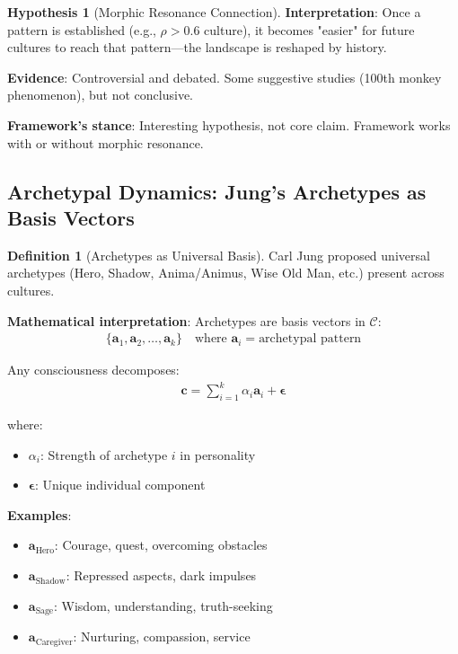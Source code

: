 \documentclass[11pt,a4paper]{article}
\theoremstyle{definition}
\newtheorem{definition}{Definition}[section]
\newtheorem{hypothesis}{Hypothesis}[section]
\theoremstyle{remark}
\newcommand{\CC}{\mathcal{C}}
\newcommand{\cc}{\mathbf{c}}
\begin{document}
\begin{small}
\begin{enumerate}
\begin{hypothesis}[Morphic Resonance Connection]
\textbf{Interpretation}: Once a pattern is established (e.g., \(\rho > 0.6\) culture), it becomes "easier" for future cultures to reach that pattern—the landscape is reshaped by history.

\textbf{Evidence}: Controversial and debated. Some suggestive studies (100th monkey phenomenon), but not conclusive.

\textbf{Framework's stance}: Interesting hypothesis, not core claim. Framework works with or without morphic resonance.
\end{hypothesis}

\subsection{Archetypal Dynamics: Jung's Archetypes as Basis Vectors}

\begin{definition}[Archetypes as Universal Basis]
Carl Jung proposed universal archetypes (Hero, Shadow, Anima/Animus, Wise Old Man, etc.) present across cultures.

\textbf{Mathematical interpretation}: Archetypes are basis vectors in \(\CC\):
\begin{align}
\{\mathbf{a}_1, \mathbf{a}_2, \ldots, \mathbf{a}_k\} \quad \text{where } \mathbf{a}_i = \text{archetypal pattern}
\end{align}

Any consciousness decomposes:
\begin{align}
\cc = \sum_{i=1}^k \alpha_i \mathbf{a}_i + \boldsymbol{\epsilon}
\end{align}

where:
\begin{itemize}
    \item \(\alpha_i\): Strength of archetype \(i\) in personality
    \item \(\boldsymbol{\epsilon}\): Unique individual component
\end{itemize}

\textbf{Examples}:
\begin{itemize}
    \item \(\mathbf{a}_{\text{Hero}}\): Courage, quest, overcoming obstacles
    \item \(\mathbf{a}_{\text{Shadow}}\): Repressed aspects, dark impulses
    \item \(\mathbf{a}_{\text{Sage}}\): Wisdom, understanding, truth-seeking
    \item \(\mathbf{a}_{\text{Caregiver}}\): Nurturing, compassion, service
\end{itemize}


\end{definition}
\end{enumerate}
\end{small}
\end{document}
